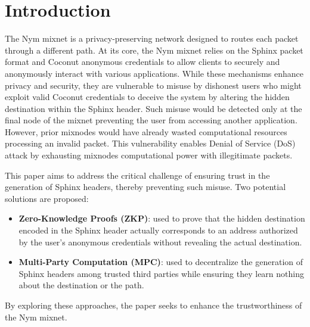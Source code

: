 \section{Introduction}

The Nym mixnet \cite{nym} is a privacy-preserving network designed to routes each packet through a different path.
At its core, the Nym mixnet relies on the Sphinx \cite{sphinx} packet format and Coconut \cite{coconut} anonymous credentials to allow clients to securely and anonymously interact with various applications.
While these mechanisms enhance privacy and security, they are vulnerable to misuse by dishonest users who might exploit valid Coconut credentials to deceive the system by altering the hidden destination within the Sphinx header.
Such misuse would be detected only at the final node of the mixnet preventing the user from accessing another application. 
However, prior mixnodes would have already wasted computational resources processing an invalid packet. 
This vulnerability enables Denial of Service (DoS) attack by exhausting mixnodes computational power with illegitimate packets.
\newline

This paper aims to address the critical challenge of ensuring trust in the generation of Sphinx headers, thereby preventing such misuse. 
Two potential solutions are proposed: 
\begin{itemize}
    \item \textbf{Zero-Knowledge Proofs (ZKP)}: used to prove that the hidden destination encoded in the Sphinx header actually corresponds to an address authorized by the user’s anonymous credentials without revealing the actual destination.
    \item \textbf{Multi-Party Computation (MPC)}:
    used to decentralize the generation of Sphinx headers among trusted third parties while ensuring they learn nothing about the destination or the path.
\end{itemize}
By exploring these approaches, the paper seeks to enhance the trustworthiness of the Nym mixnet.
